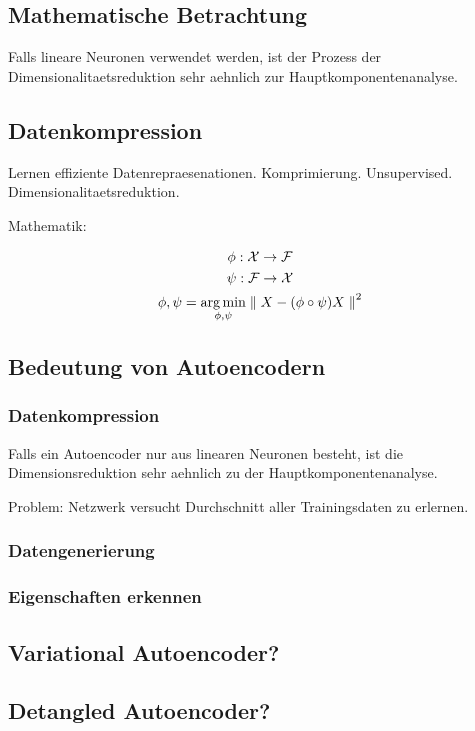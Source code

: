 \subsection{Mathematische Betrachtung}
Falls lineare Neuronen verwendet werden, ist der Prozess der
Dimensionalitaetsreduktion sehr aehnlich zur Hauptkomponentenanalyse.

\subsection{Datenkompression}

Lernen effiziente Datenrepraesenationen. Komprimierung. Unsupervised.
Dimensionalitaetsreduktion.

Mathematik:


\begin{gather}
  \phi: \mathcal{X} \to \mathcal{F}\\
  \psi: \mathcal{F} \to \mathcal{X}\\
  \displaystyle\phi,\psi = \operatorname*{\arg \min}_{\phi,\psi} \parallel {X - (\phi \circ \psi)X \parallel}^2
\end{gather}

\subsection{Bedeutung von Autoencodern}
\subsubsection{Datenkompression}
Falls ein Autoencoder nur aus linearen Neuronen besteht, ist die
Dimensionsreduktion sehr aehnlich zu der Hauptkomponentenanalyse.

Problem: Netzwerk versucht Durchschnitt aller Trainingsdaten zu erlernen.
\subsubsection{Datengenerierung}
\subsubsection{Eigenschaften erkennen}


\subsection{Variational Autoencoder?}
\subsection{Detangled Autoencoder?}

